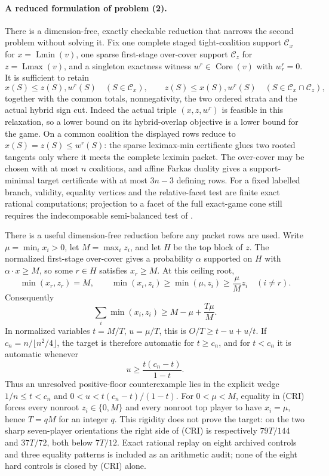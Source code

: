 \documentclass[11pt]{article}
\newcommand{\core}{\operatorname{Core}}
\newcommand{\Lmin}{\operatorname{Lmin}}
\newcommand{\Lmax}{\operatorname{Lmax}}
\begin{document}
\paragraph{A reduced formulation of problem (2).}
There is a dimension-free, exactly checkable reduction that narrows the
second problem without solving it.  Fix one complete staged tight-coalition
support $\mathcal C_x$ for $x=\Lmin(v)$, one sparse first-stage over-cover
support $\mathcal C_z$ for $z=\Lmax(v)$, and a singleton exactness witness
$w^r\in\core(v)$ with $w^r_r=0$.  It is sufficient to retain
\[
 x(S)\le z(S),w^r(S)\quad(S\in\mathcal C_x),\qquad
 z(S)\le x(S),w^r(S)\quad
 (S\in\mathcal C_x\cap\mathcal C_z),
\]
together with the common totals, nonnegativity, the two ordered strata and
the actual hybrid sign cut.  Indeed the actual triple $(x,z,w^r)$ is feasible
in this relaxation, so a lower bound on its hybrid-overlap objective is a
lower bound for the game.  On a common coalition the displayed rows reduce
to $x(S)=z(S)\le w^r(S)$: the sparse leximax-min certificate glues two rooted
tangents only where it meets the complete leximin packet.  The over-cover may
be chosen with at most $n$ coalitions, and affine Farkas duality gives a
support-minimal target certificate with at most $3n-3$ defining rows.  For a
fixed labelled branch, validity, equality vertices and the relative-facet
test are finite exact rational computations; projection to a facet of the
full exact-game cone still requires the indecomposable semi-balanced test of
\citet{StudenyKratochvil2022}.

There is a useful dimension-free reduction before any packet rows are used.
Write $\mu=\min_i x_i>0$, let $M=\max_i z_i$, and let $H$ be the top block of
$z$.  The normalized first-stage over-cover gives a probability $\alpha$
supported on $H$ with $\alpha\cdot x\ge M$, so some $r\in H$ satisfies
$x_r\ge M$.  At this ceiling root,
\[
 \min(x_r,z_r)=M,
 \qquad
 \min(x_i,z_i)\ge\min(\mu,z_i)\ge\frac{\mu}{M}z_i
 \quad(i\ne r).
\]
Consequently
\begin{equation}
 \sum_i\min(x_i,z_i)\ge M-\mu+\frac{T\mu}{M}.       \tag{CRI}
\end{equation}
In normalized variables $t=M/T$, $u=\mu/T$, this is
$O/T\ge t-u+u/t$.  If $c_n=n/\lfloor n^2/4\rfloor$, the target is therefore
automatic for $t\ge c_n$, and for $t<c_n$ it is automatic whenever
\[
 u\ge\frac{t(c_n-t)}{1-t}.
\]
Thus an unresolved positive-floor counterexample lies in the explicit wedge
$1/n\le t<c_n$ and $0<u<t(c_n-t)/(1-t)$.  For $0<\mu<M$, equality in (CRI)
forces every nonroot $z_i\in\{0,M\}$ and every nonroot top player to have
$x_i=\mu$, hence $T=qM$ for an integer $q$.  This rigidity does not prove the
target: on the two sharp seven-player orientations the right side of (CRI)
is respectively $79T/144$ and $37T/72$, both below $7T/12$.  Exact rational
replay on eight archived controls and three equality patterns is included as
an arithmetic audit; none of the eight hard controls is closed by (CRI)
alone.
\end{document}
